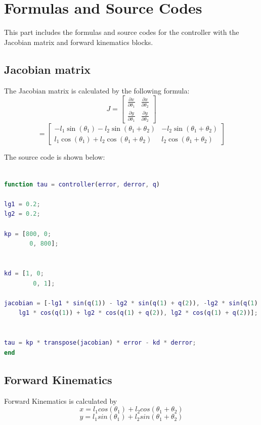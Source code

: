 \documentclass{article}
\begin{document}
\section{Formulas and Source Codes}
This part includes the formulas and source codes for the controller with the Jacobian matrix and forward kinematics blocks.
\subsection*{Jacobian matrix}
The Jacobian matrix is calculated by the following formula:\\
\[
J = \begin{bmatrix}
    \frac{\partial x}{\partial \theta_1} & \frac{\partial x}{\partial \theta_2} \\
    \frac{\partial y}{\partial \theta_1} & \frac{\partial y}{\partial \theta_2}
\end{bmatrix}
\]
\[
= \begin{bmatrix}
    -l_1 \sin(\theta_1) - l_2 \sin(\theta_1 + \theta_2) & -l_2 \sin(\theta_1 + \theta_2) \\
    l_1 \cos(\theta_1) + l_2 \cos(\theta_1 + \theta_2) & l_2 \cos(\theta_1 + \theta_2)
\end{bmatrix}
\]

    

The source code is shown below:
\begin{lstlisting}[language=Matlab, basicstyle=\small\ttfamily]

function tau = controller(error, derror, q)

lg1 = 0.2;
lg2 = 0.2;

kp = [800, 0;
       0, 800];


kd = [1, 0;
        0, 1];

jacobian = [-lg1 * sin(q(1)) - lg2 * sin(q(1) + q(2)), -lg2 * sin(q(1) + q(2));
    lg1 * cos(q(1)) + lg2 * cos(q(1) + q(2)), lg2 * cos(q(1) + q(2))];


tau = kp * transpose(jacobian) * error - kd * derror;
end

\end{lstlisting}

\subsection*{Forward Kinematics}

Forward Kinematics is calculated by\\

\begin{equation}
    x = l_1 cos(\theta_1) + l_2 cos(\theta_1 + \theta_2)
\end{equation}
\begin{equation}
    y = l_1 sin(\theta_1) + l_2 sin(\theta_1 + \theta_2)
\end{equation}
\end{document}
